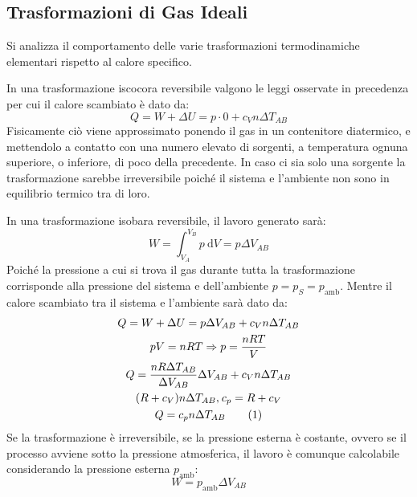 \documentclass{article}
\newcommand{\df}{\mathrm{d}}
\numberwithin{equation}{subsection}
\begin{document}
\subsection{Trasformazioni di Gas Ideali}
Si analizza il comportamento delle varie trasformazioni termodinamiche elementari rispetto al calore specifico.


In una trasformazione iscocora reversibile valgono le leggi osservate 
in precedenza per cui il calore scambiato è dato da: 
\begin{equation}
    Q=W+\Delta  U=p\cdot 0+c_Vn\Delta T_{AB}
\end{equation}
Fisicamente ciò viene approssimato ponendo il gas in un contenitore diatermico, e mettendolo a contatto con una numero elevato di sorgenti, a temperatura ognuna superiore, o 
inferiore, di poco della precedente. In caso ci sia solo una sorgente la trasformazione sarebbe irreversibile poiché il sistema e l'ambiente non sono in equilibrio termico 
tra di loro. 



In una trasformazione isobara reversibile, il lavoro generato sarà: 
\begin{equation*}
    W=\displaystyle\int_{V_A}^{V_B}p\:\df V=p\Delta V_{AB}
\end{equation*}    
Poiché la pressione a cui si trova il gas durante tutta la trasformazione corrisponde alla pressione 
del sistema e dell'ambiente $p=p_{S}=p_\mathrm{amb}$. Mentre il 
calore scambiato tra il sistema e l'ambiente sarà 
dato da: 
\begin{gather*}
    Q=W+\Delta U=p\Delta V_{AB}+c_Vn\Delta T_{AB}\\
    pV=nRT\Rightarrow p=\displaystyle\frac{nRT}{V}\\
    Q=\displaystyle\frac{nR\Delta T_{AB}}{\Delta V_{AB}}\Delta V_{AB}+c_Vn\Delta T_{AB}\\
    (R+c_V)n\Delta T_{AB}{,}\:c_p=R+c_V\\
    Q=c_pn\Delta T_{AB}\tag{\stepcounter{equation}\theequation}
\end{gather*}
Se la trasformazione è irreversibile, se la pressione esterna è costante, ovvero se il processo avviene sotto la pressione atmosferica, il lavoro è comunque calcolabile 
considerando la pressione esterna $p_\mathrm{amb}$: 
\begin{equation*}
    W=p_\mathrm{amb}\Delta V_{AB}
\end{equation*}
\end{document}
